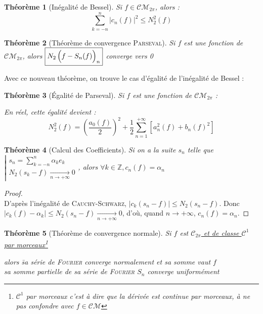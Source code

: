 \documentclass[11pt,a4paper]{report}
\newtheorem{theorem}{Théorème}[chapter]
\newtheorem{itheorem}[theorem]{Théorème}
\theoremstyle{definition}
\begin{document}
\begin{theorem}[Inégalité de Bessel]
Si $f \in \mathcal{CM}_{2\pi}$, alors : \[\sum_{k=-n}^{n} \left| c_n(f) \right| ^{2}\le N_2^{2}(f)\]
\end{theorem}
\begin{theorem}[Théorème de convergence \textsc{Parseval}]
Si $f$ est une fonction de \uline{$\mathcal{CM}_{2\pi}$}, alors $\boxed{N_2\left(\vphantom{{3^3}^3} f-S_n(f) \right)_n}$ converge vers 0
\end{theorem}
Avec ce nouveau théorème, on trouve le cas d'égalité de l'inégalité de Bessel :
\begin{itheorem}[Égalité de Parseval]
Si $f$ est une fonction de \uline{$\mathcal{CM}_{2\pi}$} : 
\begin{center}
\end{center}
En réel, cette égalité devient : 
\[
N_2^2(f) = \left( \dfrac{a_0(f)}{2} \right) ^2 + \frac{1}{2}\sum_{n=1}^{+\infty} \left[ a_n^2(f) + b_n(f)^2 \right]
\]
\end{itheorem}
\begin{theorem}[Calcul des Coefficients]
    Si on a la suite $s_n$ telle que $\left| \begin{gathered} s_n = \sum_{k=-n}^n \alpha_k e_k \\ N_2(s_k - f) \xrightarrow[n\to +\infty ]{} 0 \end{gathered}\right. $, alors $\forall k\in \mathbb{Z}, c_n(f) = \alpha_n$
\end{theorem}
\begin{proof}\hfill \\
        D'après l'inégalité de \textsc{Cauchy}-\textsc{Schwarz}, $|c_k(s_n - f)|\le N_2(s_n - f)$. Donc $|c_k(f) - \alpha_k|\le N_2(s_n - f) \xrightarrow[n\to +\infty]{} 0$, d'où, quand $n\to +\infty$, $c_n(f) = \alpha_n$.
    \end{proof}
\begin{itheorem}[Théorème de convergence normale]
Si $f$ est \underline{$\mathcal{C}_{2\pi}$ et de classe $\mathcal{C}^1$ par morceaux\footnote{$\mathcal{C}^1$ par morceaux c'est à dire que la dérivée est continue par morceaux, à ne pas confondre avec $f \in \mathcal{CM}$}}
\begin{tabbing}
alors \= sa série de \textsc{Fourier} \emph{converge normalement} et sa somme vaut $f$ \\
 \> sa somme partielle de sa série de \textsc{Fourier} $S_n$ \emph{converge uniformément}
\end{tabbing}
\end{itheorem}
\end{document}
